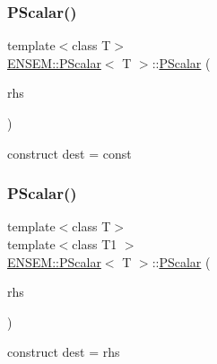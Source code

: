 \subsubsection{\texorpdfstring{PScalar()}{PScalar()}\hspace{0.1cm}{\footnotesize\ttfamily [8/18]}}
{\footnotesize\ttfamily template$<$class T$>$ \\
\mbox{\hyperlink{classENSEM_1_1PScalar}{E\+N\+S\+E\+M\+::\+P\+Scalar}}$<$ T $>$\+::\mbox{\hyperlink{classENSEM_1_1PScalar}{P\+Scalar}} (\begin{DoxyParamCaption}\item[{const typename \mbox{\hyperlink{structENSEM_1_1WordType}{Word\+Type}}$<$ T $>$\+::Type\+\_\+t \&}]{rhs }\end{DoxyParamCaption})\hspace{0.3cm}{\ttfamily [inline]}}



construct dest = const 

\mbox{\label{classENSEM_1_1PScalar_a5dad766fb1a59a9e23d03b31f22916bb}} 
\subsubsection{\texorpdfstring{PScalar()}{PScalar()}\hspace{0.1cm}{\footnotesize\ttfamily [9/18]}}
{\footnotesize\ttfamily template$<$class T$>$ \\
template$<$class T1 $>$ \\
\mbox{\hyperlink{classENSEM_1_1PScalar}{E\+N\+S\+E\+M\+::\+P\+Scalar}}$<$ T $>$\+::\mbox{\hyperlink{classENSEM_1_1PScalar}{P\+Scalar}} (\begin{DoxyParamCaption}\item[{const \mbox{\hyperlink{classENSEM_1_1PScalar}{P\+Scalar}}$<$ T1 $>$ \&}]{rhs }\end{DoxyParamCaption})\hspace{0.3cm}{\ttfamily [inline]}}



construct dest = rhs 

\mbox{\label{classENSEM_1_1PScalar_a99cdd295d67d2d32aa481a4a8d9dcc1b}} 
